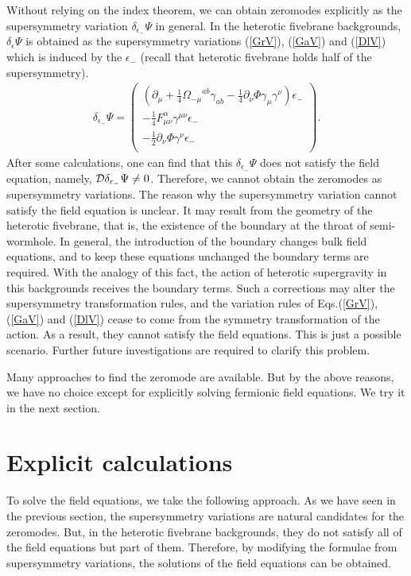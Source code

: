 \documentclass[a4paper,aps, amssymb, preprint, 12pt]{revtex4}
\begin{document}
Without relying on the index theorem, we can obtain zeromodes explicitly as the supersymmetry variation $\delta_{\epsilon_-}\Psi$ in general.
In the heterotic fivebrane backgrounds, $\delta_{\epsilon}\Psi$ is obtained as the supersymmetry variations (\ref{GrV}), (\ref{GaV}) and (\ref{DlV}) which is induced by the $\epsilon_-$ (recall that heterotic fivebrane holds half of the supersymmetry).
\begin{eqnarray} 
\delta_{\epsilon_-}\Psi = \left(
\begin{array}{c}
\left(\partial_\mu+\frac{1}{4}{\Omega_{-\mu}}^{ab}\gamma_{ab}
-\frac{1}{4}\partial_\nu\Phi\gamma_\mu\gamma^\nu\right)\epsilon_- \\
-\frac{1}{4}F_{\mu\nu}^{\alpha}\gamma^{\mu\nu}\epsilon_-\\
-\frac{1}{2}\partial_\nu\Phi\gamma^\nu\epsilon_-\\
\end{array}
\right).
\end{eqnarray}
After some calculations, one can find that this $\delta_{\epsilon_-}\Psi$ does not satisfy the field equation, namely, ${\cal D}\delta_{\epsilon_-}\Psi \neq 0$.
Therefore, we cannot obtain the zeromodes as supersymmetry variations.
The reason why the supersymmetry variation cannot satisfy the field equation is unclear.
It may result from the geometry of the heterotic fivebrane, that is, the existence of the boundary at the throat of semi-wormhole.
In general, the introduction of the boundary changes bulk field equations, and to keep these equations unchanged the boundary terms are required\cite{Gibbons-Hawking}.
With the analogy of this fact, the action of heterotic supergravity in this backgrounds receives the boundary terms.
Such a corrections may alter the supersymmetry transformation rules, and the variation rules of Eqs.(\ref{GrV}), (\ref{GaV}) and (\ref{DlV}) cease to come from the symmetry transformation of the action.
As a result, they cannot satisfy the field equations.
This is just a possible scenario.
Further future investigations are required to clarify this problem.

Many approaches to find the zeromode are available.
But by the above reasons, we have no choice except for explicitly solving fermionic field equations.
We try it in the next section.


\section{Explicit calculations}
\label{sec:four}
To solve the field equations, we take the following approach.
As we have seen in the previous section, the supersymmetry variations are natural candidates for the zeromodes.
But, in the heterotic fivebrane backgrounds, they do not satisfy all of the field equations but part of them.
Therefore, by modifying the formulae from supersymmetry variations, the solutions of the field equations can be obtained.
\end{document}
